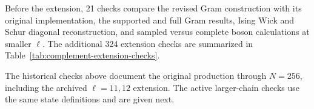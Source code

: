 Before the extension, 21 checks compare the revised Gram construction
with its original implementation, the supported and full Gram results,
Ising Wick and Schur diagonal reconstruction, and sampled versus complete
boson calculations at smaller $\ell$. The additional 324 extension
checks are summarized in Table~\ref{tab:complement-extension-checks}.


The historical checks above document the original production through
$N=256$, including the archived $\ell=11,12$ extension. The active
larger-chain checks use the same state definitions and are given next.

